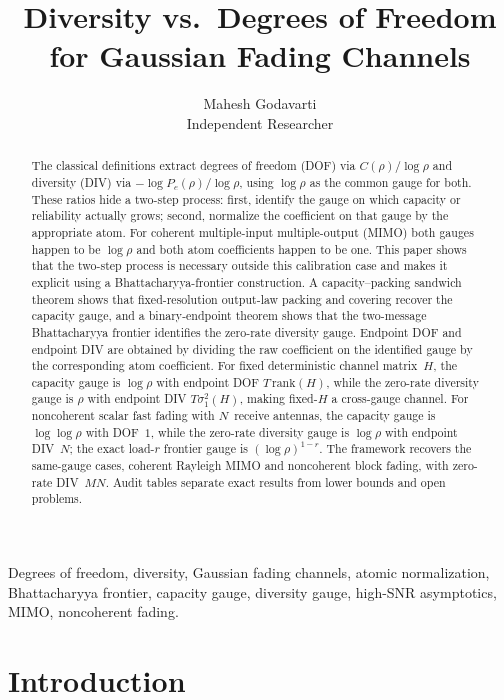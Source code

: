 \documentclass[lettersize,onecolumn]{IEEEtran}
\title{Diversity vs.\ Degrees of Freedom\\
for Gaussian Fading Channels}
\author{Mahesh Godavarti\\Independent Researcher}
\newcommand{\snr}{\rho}
\begin{document}
\maketitle

\begin{abstract}
The classical definitions extract degrees of freedom (DOF) via $C(\snr)/\log\snr$ and diversity (DIV) via $-\log P_e(\snr)/\log\snr$, using $\log\snr$ as the common gauge for both. These ratios hide a two-step process: first, identify the gauge on which capacity or reliability actually grows; second, normalize the coefficient on that gauge by the appropriate atom. For coherent multiple-input multiple-output (MIMO) both gauges happen to be $\log\snr$ and both atom coefficients happen to be one. This paper shows that the two-step process is necessary outside this calibration case and makes it explicit using a Bhattacharyya-frontier construction. A capacity--packing sandwich theorem shows that fixed-resolution output-law packing and covering recover the capacity gauge, and a binary-endpoint theorem shows that the two-message Bhattacharyya frontier identifies the zero-rate diversity gauge. Endpoint DOF and endpoint DIV are obtained by dividing the raw coefficient on the identified gauge by the corresponding atom coefficient. For fixed deterministic channel matrix~$H$, the capacity gauge is $\log\snr$ with endpoint DOF $T\,\mathrm{rank}(H)$, while the zero-rate diversity gauge is $\snr$ with endpoint DIV $T\sigma_1^2(H)$, making fixed-$H$ a cross-gauge channel. For noncoherent scalar fast fading with $N$~receive antennas, the capacity gauge is $\log\log\snr$ with DOF~$1$, while the zero-rate diversity gauge is $\log\snr$ with endpoint DIV~$N$; the exact load-$r$ frontier gauge is $(\log\snr)^{1-r}$. The framework recovers the same-gauge cases, coherent Rayleigh MIMO and noncoherent block fading, with zero-rate DIV~$MN$. Audit tables separate exact results from lower bounds and open problems.
\end{abstract}

\begin{IEEEkeywords}
Degrees of freedom, diversity, Gaussian fading channels, atomic
normalization, Bhattacharyya frontier, capacity gauge,
diversity gauge, high-SNR asymptotics, MIMO, noncoherent fading.
\end{IEEEkeywords}

\section{Introduction}\label{sec:intro}
\end{document}
